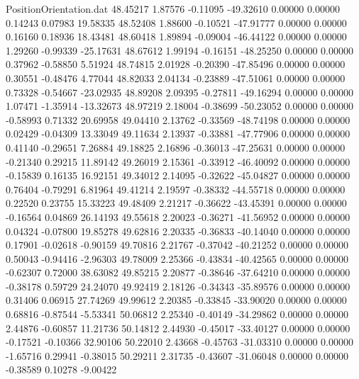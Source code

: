 \begin{filecontents}{PositionOrientation.dat}
  48.45217    1.87576   -0.11095   -49.32610    0.00000    0.00000    0.14243    0.07983   19.58335
  48.52408    1.88600   -0.10521   -47.91777    0.00000    0.00000    0.16160    0.18936   18.43481
  48.60418    1.89894   -0.09004   -46.44122    0.00000    0.00000    1.29260   -0.99339  -25.17631
  48.67612    1.99194   -0.16151   -48.25250    0.00000    0.00000    0.37962   -0.58850    5.51924
  48.74815    2.01928   -0.20390   -47.85496    0.00000    0.00000    0.30551   -0.48476    4.77044
  48.82033    2.04134   -0.23889   -47.51061    0.00000    0.00000    0.73328   -0.54667  -23.02935
  48.89208    2.09395   -0.27811   -49.16294    0.00000    0.00000    1.07471   -1.35914  -13.32673
  48.97219    2.18004   -0.38699   -50.23052    0.00000    0.00000   -0.58993    0.71332   20.69958
  49.04410    2.13762   -0.33569   -48.74198    0.00000    0.00000    0.02429   -0.04309   13.33049
  49.11634    2.13937   -0.33881   -47.77906    0.00000    0.00000    0.41140   -0.29651    7.26884
  49.18825    2.16896   -0.36013   -47.25631    0.00000    0.00000   -0.21340    0.29215   11.89142
  49.26019    2.15361   -0.33912   -46.40092    0.00000    0.00000   -0.15839    0.16135   16.92151
  49.34012    2.14095   -0.32622   -45.04827    0.00000    0.00000    0.76404   -0.79291    6.81964
  49.41214    2.19597   -0.38332   -44.55718    0.00000    0.00000    0.22520    0.23755   15.33223
  49.48409    2.21217   -0.36622   -43.45391    0.00000    0.00000   -0.16564    0.04869   26.14193
  49.55618    2.20023   -0.36271   -41.56952    0.00000    0.00000    0.04324   -0.07800   19.85278
  49.62816    2.20335   -0.36833   -40.14040    0.00000    0.00000    0.17901   -0.02618   -0.90159
  49.70816    2.21767   -0.37042   -40.21252    0.00000    0.00000    0.50043   -0.94416   -2.96303
  49.78009    2.25366   -0.43834   -40.42565    0.00000    0.00000   -0.62307    0.72000   38.63082
  49.85215    2.20877   -0.38646   -37.64210    0.00000    0.00000   -0.38178    0.59729   24.24070
  49.92419    2.18126   -0.34343   -35.89576    0.00000    0.00000    0.31406    0.06915   27.74269
  49.99612    2.20385   -0.33845   -33.90020    0.00000    0.00000    0.68816   -0.87544   -5.53341
  50.06812    2.25340   -0.40149   -34.29862    0.00000    0.00000    2.44876   -0.60857   11.21736
  50.14812    2.44930   -0.45017   -33.40127    0.00000    0.00000   -0.17521   -0.10366   32.90106
  50.22010    2.43668   -0.45763   -31.03310    0.00000    0.00000   -1.65716    0.29941   -0.38015
  50.29211    2.31735   -0.43607   -31.06048    0.00000    0.00000   -0.38589    0.10278   -9.00422

\end{filecontents}
